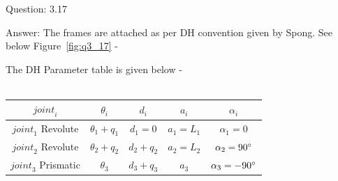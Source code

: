 \documentclass[a4paper]{article}
\begin{document}
\begin{qalist}
		\item[Question: 3.17] \setcounter{equation}{0} %
		\item[Answer:] The frames are attached as per DH convention given by Spong. See below Figure~\ref{fig:q3_17} -\\
			\begin{minipage}{\linewidth}
				\vspace{0.5cm}
				\centering
				\label{fig:q3_17}
				\vspace{0.5cm}
			\end{minipage}
			The DH Parameter table is given below - \\ \\
			\begin{minipage}{\linewidth}
				\centering
				\begin{tabular}{|c|c|c|c|c|}
					\hline
					${joint}_{i}$ & ${\theta}_{i}$ & ${d}_{i}$ & ${a}_{i}$ & ${\alpha}_{i}$\\
					\hline
					${joint}_{1}$ Revolute & ${\theta}_{1} + {q}_{1}$ & ${d}_{1} = 0$ & ${a}_{1} = {L}_{1}$ & ${\alpha}_{1} = 0$\\
					\hline
					${joint}_{2}$ Revolute & ${\theta}_{2} + {q}_{2}$ & ${d}_{2} + {q}_{2}$ & ${a}_{2} = {L}_{2}$ & ${\alpha}_{2} = 90\degree$\\
					\hline
					${joint}_{3}$ Prismatic & ${\theta}_{3}$ & ${d}_{3} + {q}_{3}$ & ${a}_{3}$ & ${\alpha}_{3} = -90\degree$\\
					\hline
				\end{tabular}
			\end{minipage}	
	\end{qalist}
\end{document}
